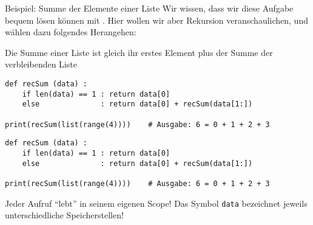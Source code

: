 
\begin{frame}[fragile]{Beispiel: Summe der Elemente einer Liste}
%
Wir wissen, dass wir diese Aufgabe bequem lösen können mit . Hier wollen wir aber Rekursion veranschaulichen, und wählen dazu folgendes Herangehen:
%
\vspace{6pt}
\begin{tcolorbox}[title=Lösungsansatz]
Die Summe einer Liste ist gleich ihr erstes Element plus der Summe der verbleibenden Liste
\end{tcolorbox}
%
\begin{codebox}
\begin{verbatim}
def recSum (data) :
    if len(data) == 1 : return data[0]
    else              : return data[0] + recSum(data[1:])
    
print(recSum(list(range(4))))    # Ausgabe: 6 = 0 + 1 + 2 + 3
\end{verbatim}
\end{codebox}
%
\end{frame}


\begin{frame}[fragile]
%
\begin{codebox}
\begin{verbatim}
def recSum (data) :
    if len(data) == 1 : return data[0]
    else              : return data[0] + recSum(data[1:])
    
print(recSum(list(range(4))))    # Ausgabe: 6 = 0 + 1 + 2 + 3
\end{verbatim}
\end{codebox}
%
\begin{codebox}[Aufruf (Zeile 5) schickt an Ebene 0, width=.7\linewidth, nobeforeafter, equal height group = B]
\scriptsize{}
	\begin{codebox}
	\scriptsize{}
		\begin{codebox}
		\scriptsize{}		
		\end{codebox}
	\end{codebox}
\end{codebox}
%
\begin{hintbox}[Beachte, width=.29\linewidth, nobeforeafter, equal height group = B]
Jeder Aufruf \enquote{lebt} in seinem eigenen Scope! Das Symbol \texttt{data} bezeichnet jeweils unterschiedliche Speicherstellen!
\end{hintbox}
%
\end{frame}

